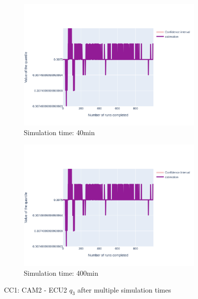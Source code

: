 \documentclass{article}
\begin{document}
\begin{figure}[H]
\begin{subfigure}{.495\textwidth}
        \vspace{.5cm}
    \end{subfigure}
    \begin{subfigure}{.495\textwidth}
        \centering
        \includegraphics[width=\textwidth]{../fig/quantile3/CC1: CAM2 --> ECU2_40mn.png}
        \caption{Simulation time: 40min}
    \end{subfigure}
    \begin{subfigure}{.495\textwidth}
        \centering
        \includegraphics[width=\textwidth]{../fig/quantile3/CC1: CAM2 --> ECU2_400mn.png}
        \caption{Simulation time: 400min}
    \end{subfigure}
    \caption{CC1: CAM2 - ECU2 $q_3$ after multiple simulation times}
\end{figure}
\end{document}
